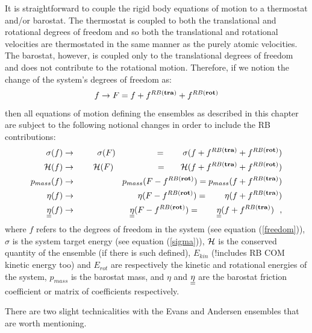 It is straightforward to couple the rigid body equations of motion to a thermostat
and/or barostat.  The thermostat is coupled to both the translational and
rotational degrees of freedom and so both the translational and rotational velocities are
thermostated in the same manner as the purely atomic velocities.  The barostat, however,
is coupled only to the translational degrees of freedom and does not contribute to the
rotational motion.  Therefore, if we notion the change of the system's degrees of freedom as:
\begin{equation}
f \rightarrow F = f + f^{RB {\bf (tra)}} + f^{RB {\bf (rot)}}
\end{equation}
then all equations of motion defining the ensembles as described in this chapter are
subject to the following notional changes in order to include the RB contributions:
\begin{eqnarray}
\sigma(f) &\rightarrow& ~~~~~\sigma(F) ~~~~~~~~~~~~~~= ~~~~~~\sigma(f + f^{RB {\bf (tra)}} + f^{RB {\bf (rot)}}) \nonumber \\
{\cal H}(f) &\rightarrow& ~~~~{\cal H}(F) ~~~~~~~~~~~~~~~= ~~~~~{\cal H}(f + f^{RB {\bf (tra)}} + f^{RB {\bf (rot)}}) \nonumber \\
p_{mass}(f) &\rightarrow& p_{mass}(F - f^{RB {\bf (rot)}}) = p_{mass}(f + f^{RB {\bf (tra)}}) \\
\eta(f) &\rightarrow& ~~~~~\eta(F - f^{RB {\bf (rot)}}) = ~~~~~~\eta(f + f^{RB {\bf (tra)}}) \nonumber \\
\mbox{$\underline{\underline{\bf \eta}}$}(f) &\rightarrow& ~~~~~\mbox{$\underline{\underline{\bf \eta}}$}(F - f^{RB {\bf (rot)}}) = ~~~~~~\mbox{$\underline{\underline{\bf \eta}}$}(f + f^{RB {\bf (tra)}})~~, \nonumber
\end{eqnarray}
where $f$ refers to the degrees of freedom in the system (see equation (\ref{freedom})),
$\sigma$ is the system target energy (see equation (\ref{sigma})), ${\cal H}$ is the
conserved quantity of the ensemble (if there is such defined), $E_{kin}$ (!includes
RB COM kinetic energy too) and $E_{rot}$ are respectively the kinetic and rotational
energies of the system, $p_{mass}$ is the barostat mass, and $\eta$ and $\mbox{$\underline{\underline{\bf \eta}}$}$
are the barostat friction coefficient or matrix of coefficients respectively.

There are two slight technicalities with the Evans and Andersen ensembles that are
worth mentioning.

